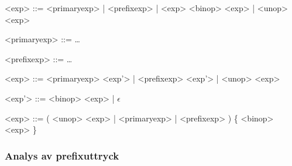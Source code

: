 \begin{description}
  \setlength{\grammarindent}{5em}
  \item[Ursprungsregel] \hfill
    \begin{grammar}
      \singlespace\small%
      \selectfont
      <exp> ::= <primaryexp> | <prefixexp> | <exp> <binop> <exp> | <unop> <exp>

      <primaryexp> ::= \ldots

      <prefixexp> ::= \ldots
    \end{grammar}

  \item[Eliminering av vänsterrekursion] \hfill
    \begin{grammar}
      \singlespace\small%
      \selectfont
      <exp> ::= <primaryexp> <exp'> | <prefixexp> <exp'> | <unop> <exp>

      <exp'> ::= <binop> <exp> | $\epsilon$
    \end{grammar}

  \item[Resultat] \hfill
    \begin{grammar}
      \singlespace\small%
      \selectfont
      <exp> ::= ( <unop> <exp> | <primaryexp> | <prefixexp> ) \{ <binop> <exp> \}
    \end{grammar}
\end{description}

\subsubsection{Analys av prefixuttryck}

